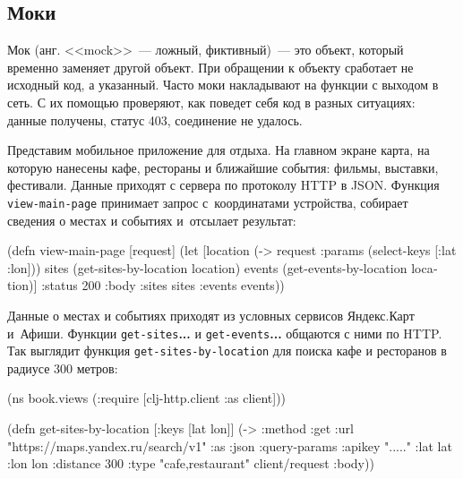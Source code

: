 \subsection{Моки}

\label{test-isolation}


Мок (анг. <<mock>>~--- ложный, фиктивный)~--- это объект, который временно
заменяет другой объект. При обращении к объекту сработает не исходный код, а
указанный. Часто моки накладывают на функции с выходом в сеть. С их помощью
проверяют, как поведет себя код в разных ситуациях: данные получены, статус 403,
соединение не удалось.

\label{mobile-app-intro}


Представим мобильное приложение для отдыха. На главном экране карта, на которую
нанесены кафе, рестораны и ближайшие события: фильмы, выставки,
фестивали. Данные приходят с сервера по протоколу HTTP в JSON. Функция
\verb|view-main-page| принимает запрос с~координатами устройства, собирает
сведения о местах и событиях и~отсылает результат:

\begin{english}
  \begin{clojure}
(defn view-main-page [request]
  (let [location (-> request :params (select-keys [:lat :lon]))
        sites (get-sites-by-location location)
        events (get-events-by-location location)]
    {:status 200
     :body {:sites sites :events events}}))
  \end{clojure}
\end{english}

Данные о местах и событиях приходят из условных сервисов Яндекс.Карт
и~Афиши. Функции \verb|get-sites|\textbf{...} и \verb|get-events|\textbf{...}
общаются с ними по HTTP. Так выглядит функция \verb|get-sites-by-location| для
поиска кафе и ресторанов в радиусе 300 метров:


\begin{english}
  \begin{clojure}
(ns book.views
  (:require [clj-http.client :as client]))

(defn get-sites-by-location
  [{:keys [lat lon]}]
  (-> {:method :get
       :url "https://maps.yandex.ru/search/v1"
       :as :json
       :query-params {:apikey "....."
                      :lat lat :lon lon :distance 300
                      :type "cafe,restaurant"}}
      client/request
      :body))
  \end{clojure}
\end{english}

